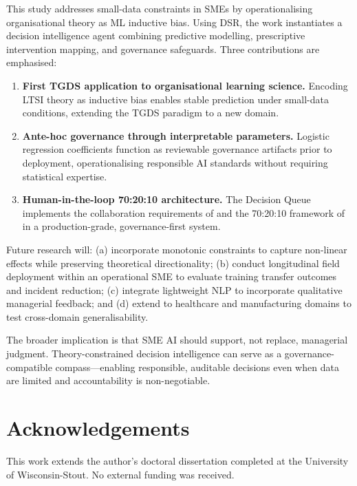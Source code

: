 \documentclass[11pt,a4paper]{article}
\begin{document}
This study addresses small-data constraints in SMEs by operationalising organisational theory as ML inductive bias. Using DSR, the work instantiates a decision intelligence agent combining predictive modelling, prescriptive intervention mapping, and governance safeguards. Three contributions are emphasised:

\begin{enumerate}[leftmargin=2em]
  \item \textbf{First TGDS application to organisational learning science.} Encoding LTSI theory as inductive bias enables stable prediction under small-data conditions, extending the TGDS paradigm \citep{karpatne2017} to a new domain.
  \item \textbf{Ante-hoc governance through interpretable parameters.} Logistic regression coefficients function as reviewable governance artifacts prior to deployment, operationalising responsible AI standards \citep{cigi2023, rudin2019} without requiring statistical expertise.
  \item \textbf{Human-in-the-loop 70:20:10 architecture.} The Decision Queue implements the collaboration requirements of \citet{mughal2023} and the 70:20:10 framework of \citet{lombardo1996} in a production-grade, governance-first system.
\end{enumerate}

Future research will: (a) incorporate monotonic constraints to capture non-linear effects while preserving theoretical directionality; (b) conduct longitudinal field deployment within an operational SME to evaluate training transfer outcomes and incident reduction; (c) integrate lightweight NLP to incorporate qualitative managerial feedback; and (d) extend to healthcare and manufacturing domains to test cross-domain generalisability.

The broader implication is that SME AI should support, not replace, managerial judgment. Theory-constrained decision intelligence can serve as a governance-compatible compass---enabling responsible, auditable decisions even when data are limited and accountability is non-negotiable.

\section*{Acknowledgements}
This work extends the author's doctoral dissertation completed at the University of Wisconsin-Stout. No external funding was received.

\newpage
\end{document}
